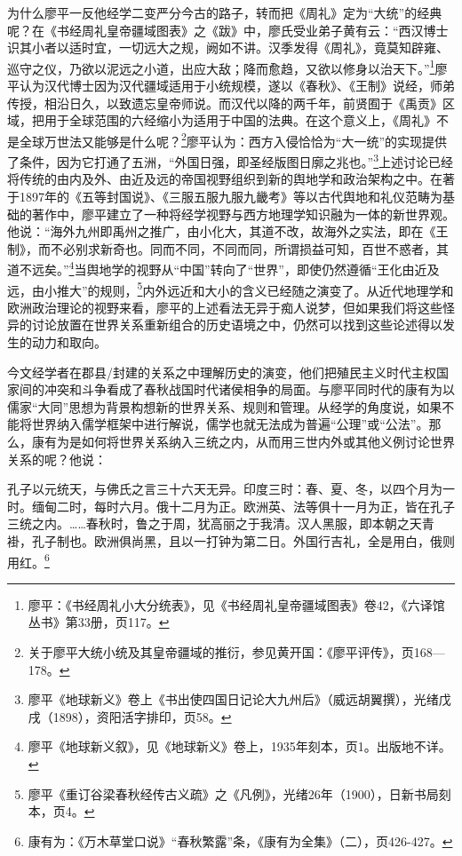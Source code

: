 \documentclass[a4paper, 12pt, openright]{ctexbook}
\renewenvironment{quote}
  {\list{}{\rightmargin2\ccwd \leftmargin2\ccwd \itemindent=2\ccwd \listparindent=2\ccwd}%
   \item\relax\small\kaishu\color{black}}
  {\endlist}
\begin{document}
为什么廖平一反他经学二变严分今古的路子，转而把《周礼》定为“大统”的经典呢？在《书经周礼皇帝疆域图表》之《跋》中，廖氏受业弟子黄有云：“西汉博士识其小者以适时宜，一切远大之规，阙如不讲。汉季发得《周礼》，竟莫知辟雍、巡守之仪，乃欲以泥远之小道，出应大敌；降而愈趋，又欲以修身以治天下。”\footnote{廖平：《书经周礼小大分统表》，见《书经周礼皇帝疆域图表》卷42，《六译馆丛书》第33册，页117。}廖平认为汉代博士因为汉代疆域适用于小统规模，遂以《春秋》、《王制》说经，师弟传授，相沿日久，以致遗忘皇帝师说。而汉代以降的两千年，前贤囿于《禹贡》区域，把用于全球范围的六经缩小为适用于中国的法典。在这个意义上，《周礼》不是全球万世法又能够是什么呢？\footnote{关于廖平大统小统及其皇帝疆域的推衍，参见黄开国：《廖平评传》，页168—178。}廖平认为：西方入侵恰恰为“大一统”的实现提供了条件，因为它打通了五洲，“外国日强，即圣经版图日廓之兆也。”\footnote{廖平《地球新义》卷上《书出使四国日记论大九州后》（威远胡翼撰），光绪戊戌（1898），资阳活字排印，页58。}上述讨论已经将传统的由内及外、由近及远的帝国视野组织到新的舆地学和政治架构之中。在著于1897年的《五等封国说》、《三服五服九服九畿考》等以古代舆地和礼仪范畴为基础的著作中，廖平建立了一种将经学视野与西方地理学知识融为一体的新世界观。他说：“海外九州即禹州之推广，由小化大，其道不改，故海外之实法，即在《王制》，而不必别求新奇也。同而不同，不同而同，所谓损益可知，百世不惑者，其道不远矣。”\footnote{廖平《地球新义叙》，见《地球新义》卷上，1935年刻本，页1。出版地不详。}当舆地学的视野从“中国”转向了“世界”，即使仍然遵循“王化由近及远，由小推大”的规则，\footnote{廖平《重订谷梁春秋经传古义疏》之《凡例》，光绪26年（1900），日新书局刻本，页4。}内外远近和大小的含义已经随之演变了。从近代地理学和欧洲政治理论的视野来看，廖平的上述看法无异于痴人说梦，但如果我们将这些怪异的讨论放置在世界关系重新组合的历史语境之中，仍然可以找到这些论述得以发生的动力和取向。

今文经学者在郡县/封建的关系之中理解历史的演变，他们把殖民主义时代主权国家间的冲突和斗争看成了春秋战国时代诸侯相争的局面。与廖平同时代的康有为以儒家“大同”思想为背景构想新的世界关系、规则和管理。从经学的角度说，如果不能将世界纳入儒学框架中进行解说，儒学也就无法成为普遍“公理”或“公法”。那么，康有为是如何将世界关系纳入三统之内，从而用三世内外或其他义例讨论世界关系的呢？他说：

\begin{quote}
孔子以元统天，与佛氏之言三十六天无异。印度三时：春、夏、冬，以四个月为一时。缅甸二时，每时六月。俄十二月为正。欧洲英、法等俱十一月为正，皆在孔子三统之内。……春秋时，鲁之于周，犹高丽之于我清。汉人黑服，即本朝之天青褂，孔子制也。欧洲俱尚黑，且以一打钟为第二日。外国行吉礼，全是用白，俄则用红。\footnote{康有为：《万木草堂口说》“春秋繁露”条，《康有为全集》（二），页426-427。}
\end{quote}
\end{document}
